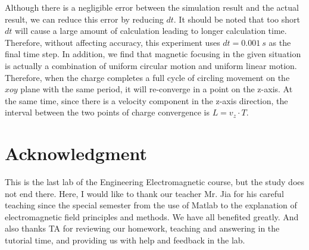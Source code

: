 \documentclass[journal,twocolumn,letterpaper]{IEEEJERM}
\begin{document}
Although there is a negligible error between the simulation result and the actual result, we can reduce this error by reducing $ dt $. It should be noted that too short $ dt $ will cause a large amount of calculation leading to longer calculation time. Therefore, without affecting accuracy, this experiment uses $ dt =0.001\ s $ as the final time step.
\newpage
In addition, we find that magnetic focusing in the given situation is actually a combination of uniform circular motion and uniform linear motion. Therefore, when the charge completes a full cycle of circling movement on the $ xoy $ plane with the same period, it will re-converge in a point on the z-axis. At the same time, since there is a velocity component in the z-axis direction, the interval between the two points of charge convergence is $ L=v_z\cdot T $.

\section*{Acknowledgment}
This is the last lab of the Engineering Electromagnetic course, but the study does not end there. 
Here, I would like to thank our teacher Mr. Jia for his careful teaching since the special semester from the use of Matlab to the explanation of electromagnetic field principles and methods. We have all benefited greatly. 
And also thanks TA for reviewing our homework, teaching and answering in the tutorial time, and providing us with help and feedback in the lab.







% 
\end{document}
